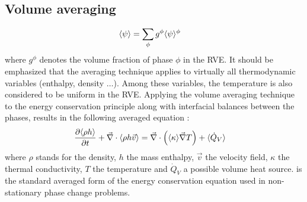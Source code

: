 \subsection{Volume averaging} 
\begin{align}
\label{eq:volume_average_psi}
& \langle \psi \rangle = \sum_\phi g^{\phi}  \langle \psi \rangle^{\phi}
\end{align}
where $g^\phi$ denotes the volume fraction of phase $\phi$ in the RVE. 
It should be emphasized that the averaging technique applies to virtually all thermodynamic variables (enthalpy, density $\dots$). 
Among these variables, the temperature is also considered to be uniform in the RVE. 
Applying the volume averaging technique to the energy 
conservation principle along with interfacial balances between the phases, results in the following averaged equation \citep{rappaz_numerical_2003}:
\begin{align}
\label{eq:averaged_energy_eqn}
& \frac{\partial \langle  \rho h  \rangle}{\partial t} + \vec{\nabla} \cdot \langle  \rho h \vec{v}  \rangle = \vec{\nabla} \cdot \left( \langle \kappa \rangle \vec{\nabla} T \right) + \langle \dot{Q}_V \rangle
\end{align}
where $\rho$ stands for the density, $h$ the mass enthalpy, $\vec{v}$ the velocity field, $\kappa$ the thermal conductivity, $T$ the temperature 
and $\dot{Q}_V$ a possible volume heat source. 
 is the standard averaged form of the energy conservation equation used in non-stationary phase 
change problems. 
 
